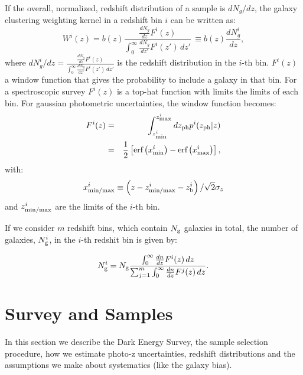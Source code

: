 \documentclass[a4paper,fleqn,usenatbib]{mnras}
\begin{document}
If the overall, normalized, redshift distribution of a sample is $dN_g/dz$, the galaxy clustering weighting kernel in a redshift bin $i$ can be written as:
\begin{equation}
\label{eq: W_i}
W^i(z) =b(z) \frac{\frac{dN_g}{dz}F^i(z)}{\int_0^\infty \frac{dN_g}{dz'}F^i(z') \,dz'} \, \equiv b(z) \frac{dN_g^i}{dz},
\end{equation}
where $dN_g^i/dz = \frac{\frac{dN_g}{dz}F^i(z)}{\int_0^\infty \frac{dN_g}{dz'}F^i(z') \,dz'} $ is the redshift distribution in the $i$-th bin.
$F^i(z)$ a window function that gives the probability to include a galaxy in that bin.
For a spectroscopic survey $F^i(z)$ is a top-hat function with limits the limits of each bin. For gaussian photometric uncertainties, the window function becomes:
\begin{eqnarray}
\label{eq: F_i}
F^i(z)&=&\int_{z^i_{\mbox{\scriptsize{min}}}}^{z^i_{\mbox{\scriptsize{max}}}} dz_{\mbox{\scriptsize{ph}}} p^i(z_{\mbox{\scriptsize{ph}}}|z)  \\
&=&\frac{1}{2}\left[\mbox{erf}\left(x^i_{\mbox{\scriptsize{min}}}\right) - \mbox{erf}\left(x^i_{\mbox{\scriptsize{max}}}\right)\right] ,
\end{eqnarray}
with:
\begin{equation}
x^i_{\mbox{\scriptsize{min/max}}} \equiv \left(z - z^i_{\mbox{\scriptsize{min/max}}} -  z^i_{\mbox{\scriptsize{b}}} \right)/\sqrt{2}\sigma_z
\end{equation}
and
$z^i_{\mbox{\scriptsize{min/max}}}$ are the limits of the  $i$-th bin.

If we consider $m$ redshift bins, which  contain $N_{\mbox{\scriptsize{g}}}$ galaxies in total, the number of galaxies, $N_{\mbox{\scriptsize{g}}}^i$, in the $i$-th redshit bin is given by:

\begin{equation}
\label{eq: gal_in_bin}
N_{\mbox{\scriptsize{g}}}^i = N_{\mbox{\scriptsize{g}}} \frac{\int_0^\infty \frac{dn}{dz}F^i(z) \,dz}{{\sum_{j=1}^m} \int_0^\infty \frac{dn}{dz}F^j(z) \,dz}.
\end{equation}



\section{Survey and Samples}
\label{sec: survey_samples}

In this section we describe the Dark Energy Survey, the sample selection procedure, how we estimate photo-z uncertainties, redshift distributions and the assumptions we make about systematics (like the galaxy bias).
\end{document}
